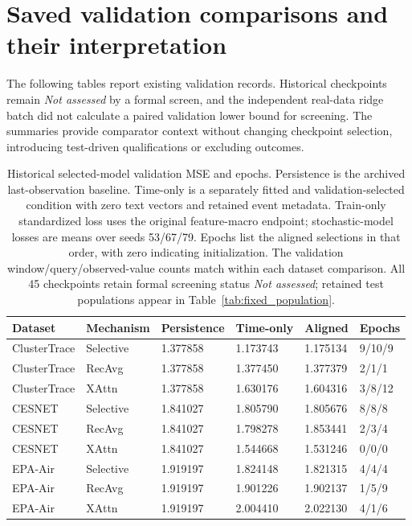 \section{Saved validation comparisons and their interpretation}
\label{sec:capability_records}

The following tables report existing validation records. Historical checkpoints remain \emph{Not assessed} by a formal screen, and the independent real-data ridge batch did not calculate a paired validation lower bound for screening. The summaries provide comparator context without changing checkpoint selection, introducing test-driven qualifications or excluding outcomes.

\begin{table}[htbp]
\centering\footnotesize
\setlength{\tabcolsep}{4pt}
\caption{Historical selected-model validation MSE and epochs. Persistence is the archived last-observation baseline. Time-only is a separately fitted and validation-selected condition with zero text vectors and retained event metadata. Train-only standardized loss uses the original feature-macro endpoint; stochastic-model losses are means over seeds 53/67/79. Epochs list the aligned selections in that order, with zero indicating initialization. The validation window/query/observed-value counts match within each dataset comparison. All 45 checkpoints retain formal screening status \emph{Not assessed}; retained test populations appear in Table~\ref{tab:fixed_population}.}
\label{tab:historical_validation}
\begin{tabular}{llllll}
\toprule
Dataset & Mechanism & Persistence & Time-only & Aligned & Epochs\\
\midrule
ClusterTrace & Selective & 1.377858 & 1.173743 & 1.175134 & 9/10/9\\
ClusterTrace & RecAvg & 1.377858 & 1.377450 & 1.377379 & 2/1/1\\
ClusterTrace & XAttn & 1.377858 & 1.630176 & 1.604316 & 3/8/12\\
CESNET & Selective & 1.841027 & 1.805790 & 1.805676 & 8/8/8\\
CESNET & RecAvg & 1.841027 & 1.798278 & 1.853441 & 2/3/4\\
CESNET & XAttn & 1.841027 & 1.544668 & 1.531246 & 0/0/0\\
EPA-Air & Selective & 1.919197 & 1.824148 & 1.821315 & 4/4/4\\
EPA-Air & RecAvg & 1.919197 & 1.901226 & 1.902137 & 1/5/9\\
EPA-Air & XAttn & 1.919197 & 2.004410 & 2.022130 & 4/1/6\\

\end{tabular}
\end{table}

